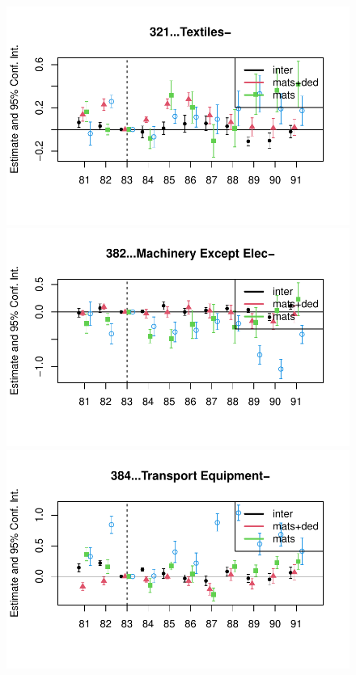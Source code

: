 \documentclass[
  12pt]{article}
\theoremstyle{definition}
\theoremstyle{remark}
\begin{document}
\begin{figure}
\begin{minipage}{\linewidth}
\includegraphics{Tax-Prod_files/figure-pdf/unnamed-chunk-11-3.pdf}

\includegraphics{Tax-Prod_files/figure-pdf/unnamed-chunk-11-4.pdf}

\includegraphics{Tax-Prod_files/figure-pdf/unnamed-chunk-11-5.pdf}


\end{minipage}
\end{figure}
\end{document}
